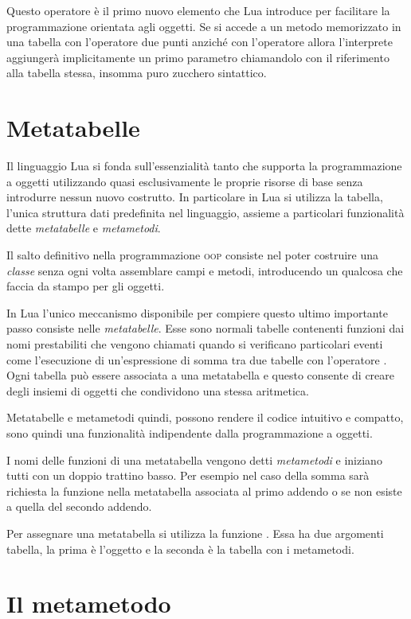 Questo operatore è il primo nuovo elemento che Lua introduce per facilitare la
programmazione orientata agli oggetti. Se si accede a un metodo memorizzato in
una tabella con l'operatore due punti \key{:} anziché con l'operatore
 allora l'interprete aggiungerà implicitamente un primo parametro
chiamandolo  con il riferimento alla tabella stessa,
insomma puro zucchero sintattico.


\section{Metatabelle}

Il linguaggio Lua si fonda sull'essenzialità tanto che supporta la
programmazione a oggetti utilizzando quasi esclusivamente le proprie risorse di
base senza introdurre nessun nuovo costrutto. In particolare in Lua si utilizza
la tabella, l'unica struttura dati predefinita nel linguaggio, assieme a
particolari funzionalità dette \emph{metatabelle} e \emph{metametodi}.

Il salto definitivo nella programmazione \textsc{oop} consiste nel poter
costruire una \emph{classe} senza ogni volta assemblare campi e metodi,
introducendo un qualcosa che faccia da stampo per gli oggetti.

In Lua l'unico meccanismo disponibile per compiere questo ultimo importante
passo consiste nelle \emph{metatabelle}. Esse sono normali tabelle contenenti
funzioni dai nomi prestabiliti che vengono chiamati quando si verificano
particolari eventi come l'esecuzione di un'espressione di somma tra due tabelle
con l'operatore \key{+}. Ogni tabella può essere associata a una metatabella e
questo consente di creare degli insiemi di oggetti che condividono una stessa
aritmetica.

Metatabelle e metametodi quindi, possono rendere il codice intuitivo e compatto,
sono quindi una funzionalità indipendente dalla programmazione a oggetti.

I nomi delle funzioni di una metatabella vengono detti \emph{metametodi} e
iniziano tutti con un doppio trattino basso. Per esempio nel caso della somma
sarà richiesta la funzione  nella metatabella associata al primo
addendo o se non esiste a quella del secondo addendo.

Per assegnare una metatabella si utilizza la funzione . Essa ha
due argomenti tabella, la prima è l'oggetto e la seconda è la tabella con i
metametodi.


\section{Il metametodo }

